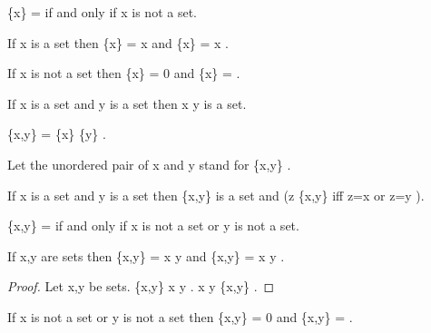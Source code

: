 \documentclass[a4paper,draft]{amsproc}
\begin{document}
\begin{forthel}
\begin{theorem}
 \{x\} =   if and only if  x  is not a set.
\end{theorem}

\begin{theorem}
If  x  is a set then  \bigcap \{x\} = x  
and  \bigcup \{x\} = x .
\end{theorem}

\begin{theorem}
If  x  is not a set then  \bigcap \{x\} = 0 
and  \bigcup \{x\} =  .
\end{theorem}

\begin{axiom}
If  x  is a set and  y  is a set then  x \cup y  is a set.
\end{axiom}

\begin{definition}  \{x,y\} = \{x\} \cup \{y\} .\end{definition}
Let the unordered pair of  x  and  y  stand for  \{x,y\} .


\begin{theorem}
If  x  is a set and  y  is a set 
then  \{x,y\}  is a set and  (z \in \{x,y\}  iff  z=x  or  z=y ). 
\end{theorem}

\begin{theorem}
 \{x,y\} =   if and only if  x  is not a set or  y  is not a set.
\end{theorem}

\begin{theorem}
If  x,y  are sets then  \bigcap \{x,y\} = x \cap y 
and  \bigcup \{x,y\} = x \cup y .
\end{theorem}
\begin{proof}
Let  x,y  be sets.
 \bigcup \{x,y\} \subset x \cup y .
 x \cup y \subset \bigcup \{x,y\} .
\end{proof}

\begin{theorem}
If  x  is not a set or  y  is not a set then
 \bigcap \{x,y\} = 0  and  \bigcup \{x,y\} =  .
\end{theorem}


\end{forthel}
\end{document}
